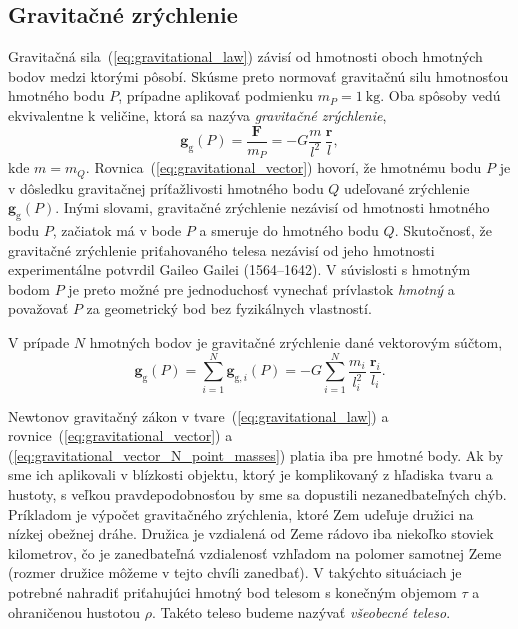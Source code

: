 \documentclass[a4paper, 12pt]{book}
\newcommand{\gidx}{\mathrm g}
\let\vec\mathbf
\begin{document}
\subsection{Gravitačné zrýchlenie}

Gravitačná sila~(\ref{eq:gravitational_law}) závisí od hmotnosti oboch hmotných 
bodov medzi ktorými pôsobí.  Skúsme preto normovať gravitačnú silu hmotnosťou 
hmotného bodu $P$, prípadne aplikovať podmienku $m_P = 1\ \mathrm{kg}$.  Oba 
spôsoby vedú ekvivalentne k veličine, ktorá sa nazýva \emph{gravitačné 
zrýchlenie},
%
\begin{equation}
\label{eq:gravitational_vector}
\vec g_\gidx(P) = \frac{\vec F}{m_P} = -G \frac{m}{l^2} \, \frac{\vec r}{l}{,}
\end{equation}
%
kde $m = m_Q$.  Rovnica~(\ref{eq:gravitational_vector}) hovorí, že hmotnému 
bodu $P$ je v dôsledku gravitačnej príťažlivosti hmotného bodu $Q$ udeľované 
zrýchlenie $\vec g_\gidx(P)$.   Inými slovami, gravitačné zrýchlenie nezávisí 
od hmotnosti hmotného bodu $P$, začiatok má v bode $P$ a smeruje do hmotného 
bodu $Q$.  Skutočnosť, že gravitačné zrýchlenie priťahovaného telesa nezávisí 
od jeho hmotnosti experimentálne potvrdil Gaileo Gailei (1564--1642).  
V súvislosti s hmotným bodom $P$ je preto možné pre jednoduchosť vynechať 
prívlastok \emph{hmotný} a považovať $P$ za geometrický bod bez fyzikálnych 
vlastností.

V prípade $N$ hmotných bodov je gravitačné zrýchlenie dané vektorovým súčtom,
%
\begin{equation}
\label{eq:gravitational_vector_N_point_masses}
\vec g_\gidx(P) = \sum_{i = 1}^{N}\vec g_{\gidx,i}(P) = -G \sum_{i = 1}^{N} 
\frac{m_i}{l_i^2} \, \frac{\vec r_i}{l_i}{.}
\end{equation}

Newtonov gravitačný zákon v tvare~(\ref{eq:gravitational_law}) 
a rovnice~(\ref{eq:gravitational_vector}) 
a (\ref{eq:gravitational_vector_N_point_masses}) platia iba pre hmotné body.  
Ak by sme ich aplikovali v blízkosti objektu, ktorý je komplikovaný z hľadiska 
tvaru a hustoty, s veľkou pravdepodobnosťou by sme sa dopustili 
nezanedbateľných chýb.  Príkladom je výpočet gravitačného zrýchlenia, ktoré Zem 
udeľuje družici na nízkej obežnej dráhe.  Družica je vzdialená od Zeme rádovo 
iba niekoľko stoviek kilometrov, čo je zanedbateľná vzdialenosť vzhľadom na 
polomer samotnej Zeme (rozmer družice môžeme v tejto chvíli zanedbať).  
V takýchto situáciach je potrebné nahradiť priťahujúci hmotný bod telesom 
s konečným objemom $\tau$ a ohraničenou hustotou $\rho$.  Takéto teleso budeme 
nazývať \emph{všeobecné teleso}.
\end{document}
